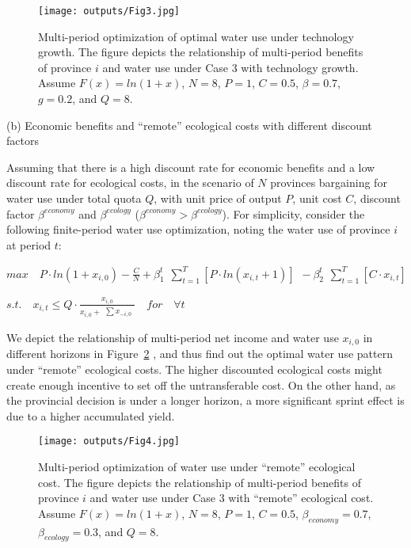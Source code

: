 \begin{case_appendix}
\begin{figure}[H]
    \centering
    \texttt{[image: outputs/Fig3.jpg]}
    \caption{Multi-period optimization of optimal water use under technology growth. The figure depicts the relationship of multi-period benefits of province $i$ and water use under Case 3 with technology growth. Assume $F(x)=ln(1+x)$, $N=8$, $P=1$, $C=0.5$, $\beta=0.7$, $g=0.2$, and $Q=8$.}
    \label{fig:technology}
\end{figure}

(b) Economic benefits and ``remote'' ecological costs with different discount factors

Assuming that there is a high discount rate for economic benefits and a low discount rate for ecological costs, in the scenario of $N$ provinces bargaining for water use under total quota $Q$, with unit price of output $P$, unit cost $C$, discount factor $\beta^{economy}$ and $\beta^{ecology}$ ($\beta^{economy} > \beta^{ecology}$). For simplicity, consider the following finite-period water use optimization, noting the water use of province $i$ at period $t$:

$ max \quad P \cdot ln(1+x_{i,0})-\frac{C}{N}+\beta_1^t \begin{matrix} \sum_{t=1}^T [P \cdot ln(x_{i,t}+1)]  \end{matrix} - \beta_2^t \begin{matrix} \sum_{t=1}^T [C \cdot x_{i,t}] \end{matrix}$

$s.t. \quad x_{i,t} \leq Q \cdot \frac{x_{i,0}}{x_{i,0} + \begin{matrix} \sum x_{-i,0} \end{matrix}} \quad for \quad \forall t$

We depict the relationship of multi-period net income and water use $x_{i,0}$ in different horizons in Figure~\ref{fig:remote}
, and thus find out the optimal water use pattern under ``remote'' ecological costs. The higher discounted ecological costs might create enough incentive to set off the untransferable cost. On the other hand, as the provincial decision is under a longer horizon, a more significant sprint effect is due to a higher accumulated yield.

\begin{figure}[H]
    \centering
    \texttt{[image: outputs/Fig4.jpg]}
    \caption{Multi-period optimization of water use under ``remote'' ecological cost. The figure depicts the relationship of multi-period benefits of province $i$ and water use under Case 3 with ``remote'' ecological cost. Assume $F(x)=ln(1+x)$, $N=8$, $P=1$, $C=0.5$, $\beta_{economy}=0.7$, $\beta_{ecology}=0.3$, and $Q=8$.}
    \label{fig:remote}
\end{figure}

\end{case_appendix}
